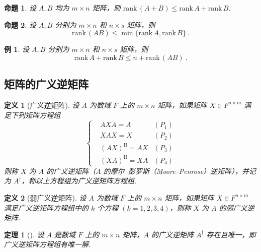 \documentclass[zihao=-4,UTF8,linespread=1.8,nothm]{aytony_base}
\newtheorem{theorem}{\indent 定理}[subsection]
\newtheorem{proposition}{\indent 命题}[subsection]
\newtheorem{definition}{\indent 定义}[subsection]
\newtheorem{example}{\indent 例}[subsection]
\begin{document}
\begin{proposition}
    设 $A, B$ 均为 $m \times n$ 矩阵，则 $\mathrm{rank}\,(A + B) \leqslant \mathrm{rank}\,A + \mathrm{rank}\,B$.
\end{proposition}

\begin{proposition}
    设 $A, B$ 分别为 $m \times n$ 和 $n \times s$ 矩阵，则 $$
        \mathrm{rank}\,(AB) \leqslant \min \{\mathrm{rank}\,A, \mathrm{rank}\,B\}\ .
    $$
\end{proposition}

\setcounter{example}{1}
\begin{example}
    设 $A, B$ 分别为 $m \times n$ 和 $n \times s$ 矩阵，则 $$
        \mathrm{rank}\,A + \mathrm{rank}\,B \leqslant n + \mathrm{rank}\,(AB)\ .
    $$
\end{example}

\setcounter{subsection}{6}
\subsection{矩阵的广义逆矩阵}

\begin{definition}[广义逆矩阵]
    设 $A$ 为数域 $F$ 上的 $m \times n$ 矩阵，如果矩阵 $X \in F^{n \times m}$ 满足下列矩阵方程组 $$
        \left\{
        \begin{aligned}
             & AXA = A              & (P_1) \\
             & XAX = X              & (P_2) \\
             & (AX)^\mathrm{H} = AX & (P_3) \\
             & (XA)^\mathrm{H} = XA & (P_4)
        \end{aligned}
        \right.
    $$ 则称 $X$ 为 $A$ 的广义逆矩阵（$A$ 的摩尔--彭罗斯（Moore--Penrose）逆矩阵），并记为 $A^\dagger$，称以上方程组为广义逆矩阵方程组.
\end{definition}

\begin{definition}[弱广义逆矩阵]
    设 $A$ 为数域 $F$ 上的 $m \times n$ 矩阵，如果矩阵 $X \in F^{n \times m}$ 满足广义逆矩阵方程组中的 $k$ 个方程 $(k = 1, 2, 3, 4)$，则称 $X$ 为 $A$ 的弱广义逆矩阵.
\end{definition}

\begin{theorem}[]
    设 $A$ 是数域 $F$ 上的 $m \times n$ 矩阵，$A$ 的广义逆矩阵 $A^\dagger$ 存在且唯一，即广义逆矩阵方程组有唯一解.
\end{theorem}
\end{document}
